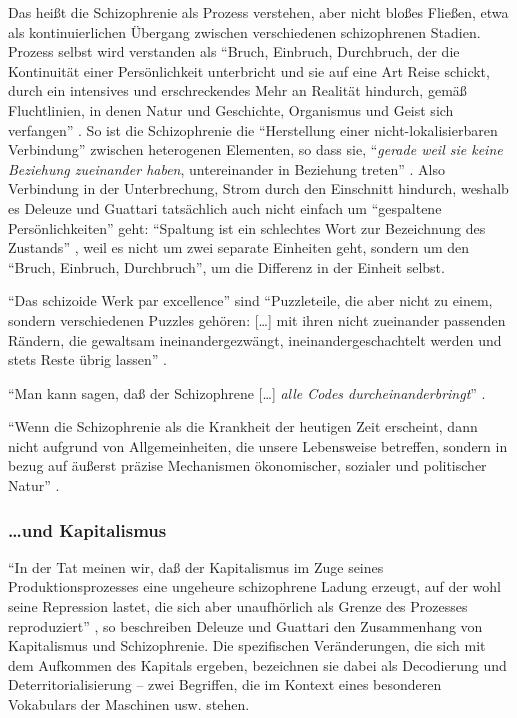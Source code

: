 \documentclass[12pt,
               DIV13,
               paper=a4,
               twoside=false,
               onehalfspacing,
               bibliography=totoc,
               toc=graduated,
               draft,
               ]{scrartcl}
\newcommand{\lips}{\dots\unkern}
\newcommand{\pc}[2]{\parencite[#1]{#2}}
\newcommand{\worries}[1]{\ifdraft{\textcolor{blue}{\texttt{(#1)}}}{}}
\begin{document}
Das heißt die Schizophrenie als Prozess verstehen, aber nicht bloßes
Fließen, etwa als kontinuierlichen Übergang zwischen verschiedenen
schizophrenen Stadien. Prozess selbst wird verstanden als "`Bruch, Einbruch,
Durchbruch, der die Kontinuität einer Persönlichkeit unterbricht und
sie auf eine Art Reise schickt, durch ein intensives und
erschreckendes \glq Mehr an Realität\grq{} hindurch, gemäß
Fluchtlinien, in denen Natur und Geschichte, Organismus und Geist sich
verfangen"' \pc{28}{schizg}. So ist die Schizophrenie die
"`Herstellung einer nicht-lokalisierbaren Verbindung"' \pc{19}{schizg}
zwischen heterogenen Elementen, so dass sie, "`\emph{gerade weil sie
keine Beziehung zueinander haben}, untereinander in Beziehung treten"'
\pc{19}{schizg}. Also Verbindung in der Unterbrechung, Strom durch den
Einschnitt hindurch, weshalb es Deleuze und Guattari tatsächlich auch
nicht einfach um "`gespaltene Persönlichkeiten"' geht: "`Spaltung ist
ein schlechtes Wort zur Bezeichnung des Zustands"' \pc{27}{schizg},
weil es nicht um zwei separate Einheiten geht, sondern um den "`Bruch,
Einbruch, Durchbruch"', um die Differenz in der Einheit selbst.

"`Das schizoide Werk par excellence"' \pc{54}{ao} sind "`Puzzleteile,
die aber nicht zu einem, sondern verschiedenen Puzzles gehören:
[\lips] mit ihren nicht zueinander passenden Rändern, die gewaltsam
ineinandergezwängt, ineinandergeschachtelt werden und stets Reste
übrig lassen"' \pc{54}{ao}.

"`Man kann sagen, daß der Schizophrene [\lips] \emph{alle Codes
durcheinanderbringt}"' \pc{22}{ao}. \worries{?}

"`Wenn die Schizophrenie als die Krankheit der heutigen Zeit
erscheint, dann nicht aufgrund von Allgemeinheiten, die unsere
Lebensweise betreffen, sondern in bezug auf äußerst präzise
Mechanismen ökonomischer, sozialer und politischer Natur"' \pc{28}{schizg}.



\subsubsection{\dots und Kapitalismus}

"`In der Tat meinen wir, daß der Kapitalismus im Zuge seines
Produktionsprozesses eine ungeheure schizophrene Ladung erzeugt, auf
der wohl seine Repression lastet, die sich aber unaufhörlich als
Grenze des Prozesses reproduziert"' \pc{45}{ao}, so beschreiben
Deleuze und Guattari den Zusammenhang von Kapitalismus und
Schizophrenie. Die spezifischen Veränderungen, die sich mit dem
Aufkommen des Kapitals ergeben, bezeichnen sie dabei als Decodierung
und Deterritorialisierung -- zwei Begriffen, die im Kontext eines
besonderen Vokabulars der Maschinen usw. \worries{?} stehen.
\end{document}
